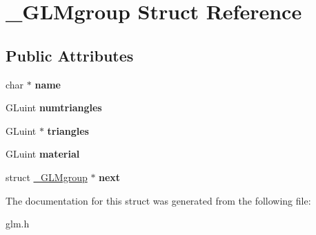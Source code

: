 \hypertarget{struct__GLMgroup}{\section{\-\_\-\-G\-L\-Mgroup \-Struct \-Reference}
\label{struct__GLMgroup}
}
\subsection*{\-Public \-Attributes}
\begin{DoxyCompactItemize}
\item 
\hypertarget{struct__GLMgroup_a17de10f71e980597335b72790acd6ec1}{char $\ast$ {\bfseries name}}\label{struct__GLMgroup_a17de10f71e980597335b72790acd6ec1}

\item 
\hypertarget{struct__GLMgroup_a7f5703d566fc731318d07d6a82a467f6}{\-G\-Luint {\bfseries numtriangles}}\label{struct__GLMgroup_a7f5703d566fc731318d07d6a82a467f6}

\item 
\hypertarget{struct__GLMgroup_a08193e7d23bf6d32159d659380257240}{\-G\-Luint $\ast$ {\bfseries triangles}}\label{struct__GLMgroup_a08193e7d23bf6d32159d659380257240}

\item 
\hypertarget{struct__GLMgroup_a3127ad008b432a5a1fcdc4cde924bd5e}{\-G\-Luint {\bfseries material}}\label{struct__GLMgroup_a3127ad008b432a5a1fcdc4cde924bd5e}

\item 
\hypertarget{struct__GLMgroup_a36bec6ef13eb38672c7bcd6d79681945}{struct \hyperlink{struct__GLMgroup}{\-\_\-\-G\-L\-Mgroup} $\ast$ {\bfseries next}}\label{struct__GLMgroup_a36bec6ef13eb38672c7bcd6d79681945}

\end{DoxyCompactItemize}


\-The documentation for this struct was generated from the following file\-:\begin{DoxyCompactItemize}
\item 
glm.\-h\end{DoxyCompactItemize}
